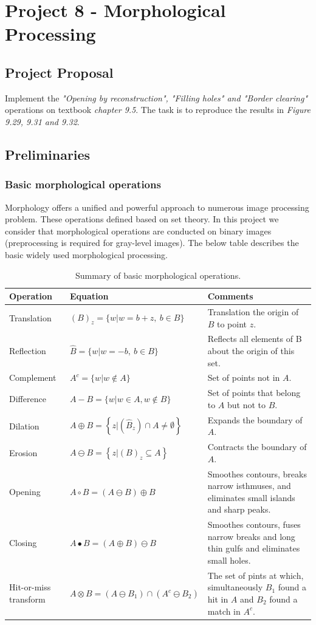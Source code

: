 \section{Project 8 - Morphological Processing}

\subsection{Project Proposal}
Implement the \emph{"Opening by reconstruction", "Filling holes" and "Border clearing"} operations on textbook \emph{chapter 9.5}. The task is to reproduce the results in \emph{Figure 9.29, 9.31 and 9.32}.

\subsection{Preliminaries}
\subsubsection{Basic morphological operations}
Morphology offers a unified and powerful approach to numerous image processing problem. These operations defined based on set theory. In this project we consider that morphological operations are conducted on binary images (preprocessing is required for gray-level images). The below table describes the basic widely used morphological processing.
\begin{table}[h]
	\caption{Summary of basic morphological operations.}
	\centering
	\begin{tabular}{|l|l|m{}|}\hline
		Operation & Equation & Comments\\ \hline
		Translation & $(B)_z=\{w|w=b+z, ~ b \in B \}$ & Translation the origin of $B$ to point $z$.\\
		Reflection & $\hat{B}=\{w|w=-b, ~ b \in B\}$ & Reflects all elements of B about the origin of this set.\\
		Complement & $A^c=\{ w|w \notin A \}$ & Set of points not in $A$.\\
		Difference & $A-B=\{ w|w \in A, w \notin B\}$ & Set of points that belong to $A$ but not to $B$.\\
		Dilation & $A \oplus B=\left\{ z|(\hat{B}_z) \cap A \neq \emptyset \right\}$ & Expands the boundary of $A$.\\
		Erosion & $A \ominus B=\left\{ z|(B)_z \subseteq A \right\}$ & Contracts the boundary of $A$.\\
		Opening & $A \circ B=(A\ominus B)\oplus B $ & Smoothes contours, breaks narrow isthmuses, and eliminates small islands and sharp peaks.\\
		Closing & $A \bullet B=(A\oplus B)\ominus B $ & Smoothes contours, fuses narrow breaks and long thin gulfs and eliminates small holes.\\
		Hit-or-miss transform & $A \otimes B=(A\ominus B_1)\cap(A^c\ominus B_2)$ & The set of pints at which, simultaneously $B_1$ found a hit in $A$ and $B_2$ found a match in $A^c$.\\ \hline
	\end{tabular}
\end{table}

